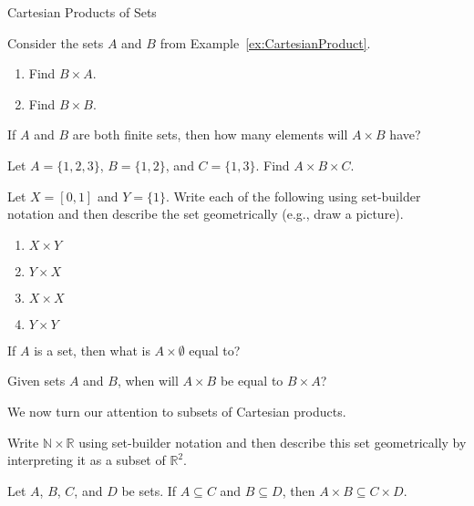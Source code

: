 \begin{section}{Cartesian Products of Sets}
\begin{problem}
Consider the sets $A$ and $B$ from Example~\ref{ex:CartesianProduct}.
\begin{enumerate}[label=\textrm{(\alph*)}]
\item Find $B\times A$. 
\item Find $B\times B$.
\end{enumerate}
\end{problem}

\begin{problem}
If $A$ and $B$ are both finite sets, then how many elements will $A\times B$ have?
\end{problem}

\begin{problem} 
Let $A=\{1, 2, 3\}$, $B=\{1,2\}$, and $C=\{1,3\}$. Find $A \times B\times C$. 
\end{problem}

\begin{problem}
Let $X=[0,1]$ and $Y=\{1\}$.  Write each of the following using set-builder notation and then describe the set geometrically (e.g., draw a picture). 
\begin{enumerate}[label=\textrm{(\alph*)}]
\item $X\times Y$
\item $Y\times X$
\item $X\times X$
\item $Y\times Y$
\end{enumerate}
\end{problem}

\begin{problem}
If $A$ is a set, then what is $A\times \emptyset$ equal to?
\end{problem}

\begin{problem}
Given sets $A$ and $B$, when will $A\times B$ be equal to $B\times A$?
\end{problem}

We now turn our attention to subsets of Cartesian products.

\begin{problem}\label{prob:some lines}
Write $\mathbb{N}\times \mathbb{R}$ using set-builder notation and then describe this set geometrically by interpreting it as a subset of $\mathbb{R}^2$.
\end{problem}

\begin{theorem}
Let $A$, $B$, $C$, and $D$ be sets. If $A\subseteq C$ and $B\subseteq D$, then $A\times B\subseteq C\times D$.
\end{theorem}


\end{section}

